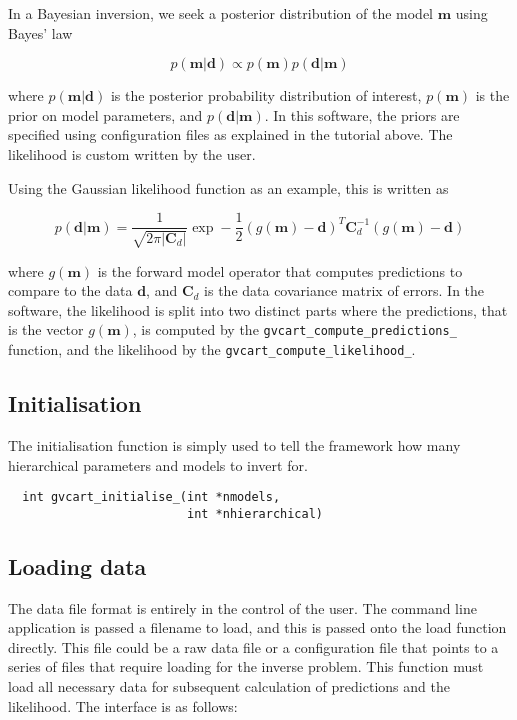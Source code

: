 \documentclass[a4paper,12pt]{article}
\begin{document}
In a Bayesian inversion, we seek a posterior distribution of the model $\mathbf{m}$
using Bayes' law

\begin{equation}
  p(\mathbf{m}|\mathbf{d}) \propto p(\mathbf{m}) p(\mathbf{d}|\mathbf{m})
\end{equation}

where $p(\mathbf{m}|\mathbf{d})$ is the posterior probability distribution
of interest, $p(\mathbf{m})$ is the prior on model parameters, and $p(\mathbf{d}|\mathbf{m})$.
In this software, the priors are specified using configuration files as
explained in the tutorial above. The likelihood is custom written by the
user.

Using the Gaussian likelihood function as an example, this is written
as

\begin{equation}
  p(\mathbf{d}|\mathbf{m}) = \frac{1}{\sqrt{2\pi |\mathbf{C}_d|}} \exp -\frac{1}{2} (g(\mathbf{m}) - \mathbf{d})^T
  \mathbf{C}_d^{-1} (g(\mathbf{m}) - \mathbf{d})
\end{equation}

where $g(\mathbf{m})$ is the forward model operator that computes predictions to
compare to the data $\mathbf{d}$, and $\mathbf{C}_d$ is the data covariance
matrix of errors. In the software, the likelihood is split into two distinct parts
where the predictions, that is the vector $g(\mathbf{m})$, is computed by
the \texttt{gvcart\_compute\_predictions\_} function, and the likelihood by
the \texttt{gvcart\_compute\_likelihood\_}. 

\subsection{Initialisation}

The initialisation function is simply used to tell the framework how
many hierarchical parameters and models to invert for.

\begin{verbatim}
  int gvcart_initialise_(int *nmodels,
                         int *nhierarchical)
\end{verbatim}

\subsection{Loading data}

The data file format is entirely in the control of the user. 
The command line application is passed a filename to load, and this is
passed onto the load function directly. This file could be a raw data
file or a configuration file that points to a series of files that
require loading for the inverse problem. This function must load all
necessary data for subsequent calculation of predictions and the
likelihood. The interface is as follows:
\end{document}
